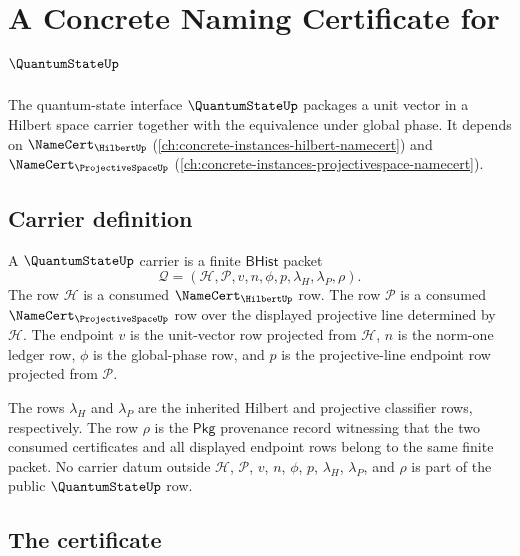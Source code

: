 \chapter{A Concrete Naming Certificate for $\QuantumStateUp$}
\label{ch:concrete-instances-quantumstate-namecert}

The quantum-state interface $\QuantumStateUp$ packages a unit vector in a Hilbert space carrier together with the equivalence under global phase. It depends on $\NameCert_{\HilbertUp}$ (\autoref{ch:concrete-instances-hilbert-namecert}) and $\NameCert_{\ProjectiveSpaceUp}$ (\autoref{ch:concrete-instances-projectivespace-namecert}).

\section{Carrier definition}
\label{sec:quantumstate-carrier}

\begin{definition}
\label{def:quantumstate-bhist-carrier}
A $\QuantumStateUp$ carrier is a finite $\mathsf{BHist}$ packet
$$
\mathcal{Q}=(\mathcal{H},\mathcal{P},v,n,\phi,p,\lambda_H,\lambda_P,\rho).
$$
The row $\mathcal{H}$ is a consumed $\NameCert_{\HilbertUp}$ row. The row
$\mathcal{P}$ is a consumed $\NameCert_{\ProjectiveSpaceUp}$ row over the
displayed projective line determined by $\mathcal{H}$. The endpoint $v$ is the
unit-vector row projected from $\mathcal{H}$, $n$ is the norm-one ledger row,
$\phi$ is the global-phase row, and $p$ is the projective-line endpoint row
projected from $\mathcal{P}$.

The rows $\lambda_H$ and $\lambda_P$ are the inherited Hilbert and projective
classifier rows, respectively. The row $\rho$ is the $\mathsf{Pkg}$ provenance
record witnessing that the two consumed certificates and all displayed endpoint
rows belong to the same finite packet. No carrier datum outside
$\mathcal{H}$, $\mathcal{P}$, $v$, $n$, $\phi$, $p$, $\lambda_H$, $\lambda_P$,
and $\rho$ is part of the public $\QuantumStateUp$ row.
\end{definition}

\section{The certificate}
\label{sec:quantumstate-certificate}


